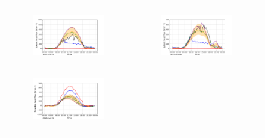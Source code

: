\begin{figure}[hbtp]
\begin{tabular}{cc}
        \begin{subfigure}[t]{0.5\textwidth}
            \caption{}
            \includegraphics[width=\textwidth]{images/chap5/IOP_TS/TS_2021-07-15_cendrosa_flat.png}
        \end{subfigure} &
        \begin{subfigure}[t]{0.5\textwidth}
            \caption{}
            \includegraphics[width=\textwidth]{images/chap5/IOP_TS/TS_2021-07-20_cendrosa_flat.png}
        \end{subfigure} \\
        \begin{subfigure}[t]{0.5\textwidth}
            \caption{}
            \includegraphics[width=\textwidth]{images/chap5/IOP_TS/TS_2021-07-15_cendrosa_sens.png}

\end{subfigure}
\end{tabular}
\end{figure}
